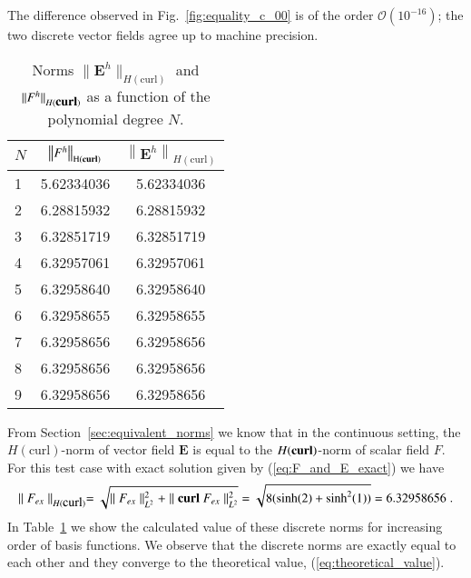 \documentclass[graybox]{svmult}
\begin{document}
The difference observed in Fig.~\ref{fig:equality_c_00} is of the order $\mathcal{O}(10^{-16})$; the two discrete vector fields agree up to machine precision.
\begin{table}[htbp]
	\centering
	\caption{Norms $\| \bm{E}^h \|_{H(\mbox{curl})}$ and $\|F^h\|_{H(\mbox{\bf{curl}})}$ as a function of the polynomial degree $N$.}
	\begin{tabular}{lcc}
		 \quad $N$ \quad  & \quad $\left\|F^{h}\right\|_{\mathrm{H(\bf{curl})}}$ \quad & \quad $\left\|\bm{E}^{h}\right\|_{H\mathrm{(curl)}}$ \quad \\
		\hline
1 & 5.62334036 &  5.62334036 \\

2 & 6.28815932 & 6.28815932 \\

3 & 6.32851719 & 6.32851719 \\

4 & 6.32957061 & 6.32957061 \\

5 & 6.32958640 & 6.32958640 \\

6 & 6.32958655 & 6.32958655 \\

7 & 6.32958656 & 6.32958656 \\

8 & 6.32958656 & 6.32958656 \\

9 & 6.32958656 & 6.32958656 \\
		\hline
	\end{tabular}%
	\label{tab:norm}%
\end{table}

From Section~\ref{sec:equivalent_norms} we know that in the continuous setting, the $H(\mbox{curl})$-norm of vector field $\bm{E}$ is equal to the $H(\mbox{\bf{curl}})$-norm of scalar field $F$.
For this test case with exact solution given by (\ref{eq:F_and_E_exact}) we have
\begin{equation}
\parallel F_{ex} \parallel_{H(\mbox{curl})} =
\sqrt{\parallel F_{ex} \parallel_{L^2}^2 + \parallel \mbox{\bf{curl}}\ F_{ex} \parallel_{L^2}^2}
= \sqrt{8(\sinh(2)+\sinh^2(1))} = 6.32958656 \;.
\label{eq:theoretical_value}
\end{equation}
In Table~\ref{tab:norm} we show the calculated value of these discrete norms for increasing order of basis functions.
We observe that the discrete norms are exactly equal to each other and they converge to the theoretical value, (\ref{eq:theoretical_value}).
\end{document}
